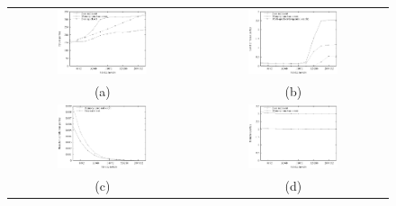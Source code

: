 \documentclass[acmtocl]{acmtrans2m}
\begin{document}
\begin{figure}
\centering
\begin{tabular}{cc}
\includegraphics[width=0.5\textwidth]{plots/radix_cycles.eps} & \includegraphics[width=0.5\textwidth]{plots/radix_versus_quick_level_2_misses.eps} \\
(a) & (b) \\
\includegraphics[width=0.5\textwidth]{plots/radix_branch_misses.eps} & \includegraphics[width=0.5\textwidth]{plots/radix_branches.eps} \\
(c) & (d) \\
\end{tabular}

\end{figure}
\end{document}
